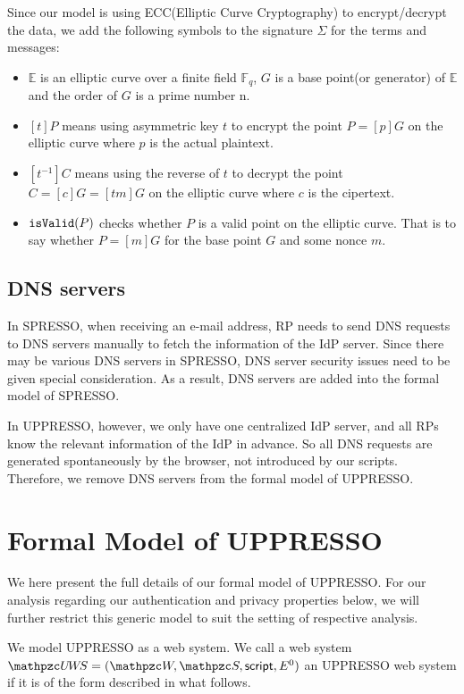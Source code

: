 \documentclass[letterpaper,onecolumn,10pt]{article}
\begin{document}
Since our model is using ECC(Elliptic Curve Cryptography) to encrypt/decrypt the data,
we add the following symbols to the signature $\Sigma$ for the terms and messages:

\begin{itemize}
  \item $\mathbb{E}$ is an elliptic curve over a finite field $\mathbb{F}_q$, $G$ is a base point(or generator) of $\mathbb{E}$ and the order of $G$ is a prime number n.
  \item $[t]P$ means using asymmetric key $t$ to encrypt the point $P=[p]G$ on the elliptic curve where $p$ is the actual plaintext.
  \item $[t^{-1}]C$ means using the reverse of $t$ to decrypt the point $C=[c]G=[tm]G$ on the elliptic curve where $c$ is the cipertext.  
  \item $\mathtt{isValid}(P)$ checks whether $P$ is a valid point on the elliptic curve. That is to say whether $P=[m]G$ for the base point $G$ and some nonce $m$.
\end{itemize}

\subsection{DNS servers}


In SPRESSO, when receiving an e-mail address, 
RP needs to send DNS requests to DNS servers manually 
to fetch the information of the IdP server. 
Since there may be various DNS servers in SPRESSO, 
DNS server security issues need to be given special consideration.
As a result, DNS servers are added into the formal model of SPRESSO.

In UPPRESSO, however, we only have one centralized IdP server, and 
all RPs know the relevant information of the IdP in advance.
So all DNS requests are generated spontaneously by the browser, 
not introduced by our scripts.
Therefore, we remove DNS servers from the formal model of UPPRESSO.


\section{Formal Model of UPPRESSO}
\label{app:model-uppresso}
We here present the full details of our formal model of UPPRESSO. For our analysis regarding our authentication and privacy properties below, we will further restrict this generic model to suit the setting of respective analysis.\par
We model UPPRESSO as a web system. We call a web system $\uppressowebsystem=(\bidsystem, \scriptset, \mathsf{script}, E^0)$ an UPPRESSO web system if it is of the form described in what follows.
\end{document}
